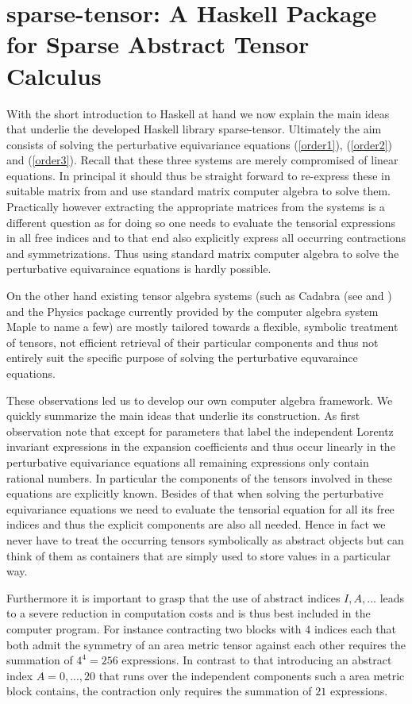 \documentclass[a4paper,12pt, DIV=14, BCOR=5mm, twoside, headsepline]{scrbook}
\begin{document}
\section{sparse-tensor: A Haskell Package for Sparse Abstract Tensor Calculus}
With the short introduction to Haskell at hand we now explain the main ideas that underlie the developed Haskell library sparse-tensor. Ultimately the aim consists of solving the perturbative equivariance equations (\ref{order1}), (\ref{order2}) and (\ref{order3}). Recall that these three systems are merely compromised of linear equations. In principal it should thus be straight forward to re-express these in suitable matrix from and use standard matrix computer algebra to solve them. Practically however extracting the appropriate matrices from the systems is a different question as for doing so one needs to evaluate the tensorial expressions in all free indices and to that end also
explicitly express all occurring contractions and symmetrizations.
Thus using standard matrix computer algebra to solve the perturbative equivaraince equations is hardly possible.

On the other hand existing tensor algebra systems (such as Cadabra (see \cite{cadabra1} and \cite{cadabra2}) and the Physics package currently provided by the computer algebra system Maple to name a few) are mostly tailored towards a flexible, symbolic treatment of tensors, not efficient retrieval of their particular components and thus not entirely suit the specific purpose of solving the perturbative equvaraince equations. 

These observations led us to develop our own computer algebra framework. We quickly summarize the main ideas that underlie its construction.
As first observation note that except for parameters that label the independent Lorentz invariant expressions in the expansion coefficients and thus occur linearly in the perturbative equivariance equations all remaining expressions only contain rational numbers. In particular the components of the tensors involved in these equations are explicitly known. Besides of that when solving the perturbative equivariance equations we need to evaluate the tensorial equation for all its free indices and thus the explicit components are also all needed. Hence in fact we never have to treat the occurring tensors symbolically as abstract objects but can think of them as containers that are simply used to store values in a particular way. 

Furthermore it is important to grasp that the use of abstract indices $I, A, ...$ leads to a severe reduction in computation costs and is thus best included in the computer program. For instance contracting two blocks with $4$ indices each that both admit the symmetry of an area metric tensor against each other requires the summation of $4^4 = 256$ expressions. In contrast to that introducing an abstract index $A = 0,...,20$ that runs over the independent components such a area metric block contains, the contraction only requires the summation of $21$ expressions.
\end{document}

